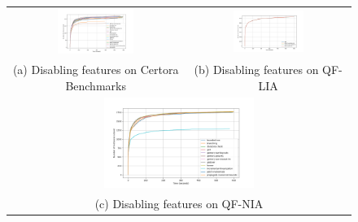 \begin{figure}[htbp]
  \centering
  \begin{tabular}{cc}
    \includegraphics[width=0.45\textwidth]{../data/benchmark-submission.png} &
    \includegraphics[width=0.45\textwidth]{../data/qf-lia.png} \\
    (a) Disabling features on Certora Benchmarks &
    (b) Disabling features on QF-LIA \\
    \multicolumn{2}{c}{
      \includegraphics[width=0.45\textwidth]{../data/qf-nia-small.png}
    } \\
    \multicolumn{2}{c}{
      (c) Disabling features on QF-NIA
    } \\
  \end{tabular}
 
\end{figure}

